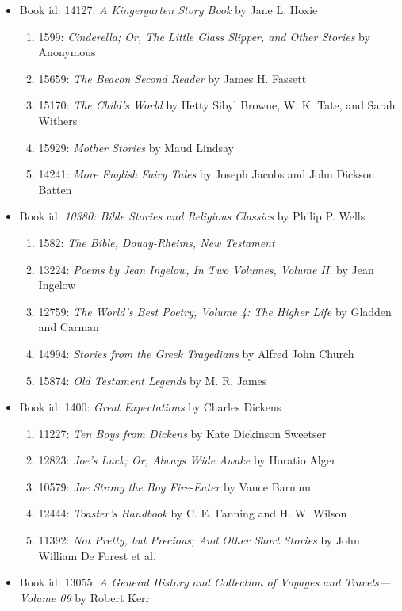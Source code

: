 \documentclass[10pt]{report}
\begin{document}
\begin{itemize}
\item
Book id: 14127: \textit{A Kingergarten Story Book} by Jane L. Hoxie
\begin{enumerate}
\item
1599: \textit{Cinderella; Or, The Little Glass Slipper, and Other Stories} by Anonymous
\item
15659: \textit{The Beacon Second Reader} by James H. Fassett
\item
15170: \textit{The Child's World} by Hetty Sibyl Browne, W. K. Tate, and Sarah Withers
\item
15929: \textit{Mother Stories} by Maud Lindsay
\item
14241: \textit{More English Fairy Tales} by Joseph Jacobs and John Dickson Batten
\end{enumerate}
\item
Book id: \textit{10380: Bible Stories and Religious Classics} by Philip P. Wells
\begin{enumerate}
\item
1582: \textit{The Bible, Douay-Rheims, New Testament}
\item
13224: \textit{Poems by Jean Ingelow, In Two Volumes, Volume II.} by Jean Ingelow
\item
12759: \textit{The World's Best Poetry, Volume 4: The Higher Life} by Gladden and Carman
\item
14994: \textit{Stories from the Greek Tragedians} by Alfred John Church
\item
15874: \textit{Old Testament Legends} by M. R. James
\end{enumerate}
\item
Book id: 1400: \textit{Great Expectations} by Charles Dickens
\begin{enumerate}
\item
11227: \textit{Ten Boys from Dickens} by Kate Dickinson Sweetser
\item
12823: \textit{Joe's Luck; Or, Always Wide Awake} by Horatio Alger
\item
10579: \textit{Joe Strong the Boy Fire-Eater} by Vance Barnum
\item
12444: \textit{Toaster's Handbook} by C. E. Fanning and H. W. Wilson
\item
11392: \textit{Not Pretty, but Precious; And Other Short Stories} by John William De Forest et al.
\end{enumerate}
\item
Book id: 13055: \textit{A General History and Collection of Voyages and Travels---Volume 09} by Robert Kerr

\end{itemize}
\end{document}
